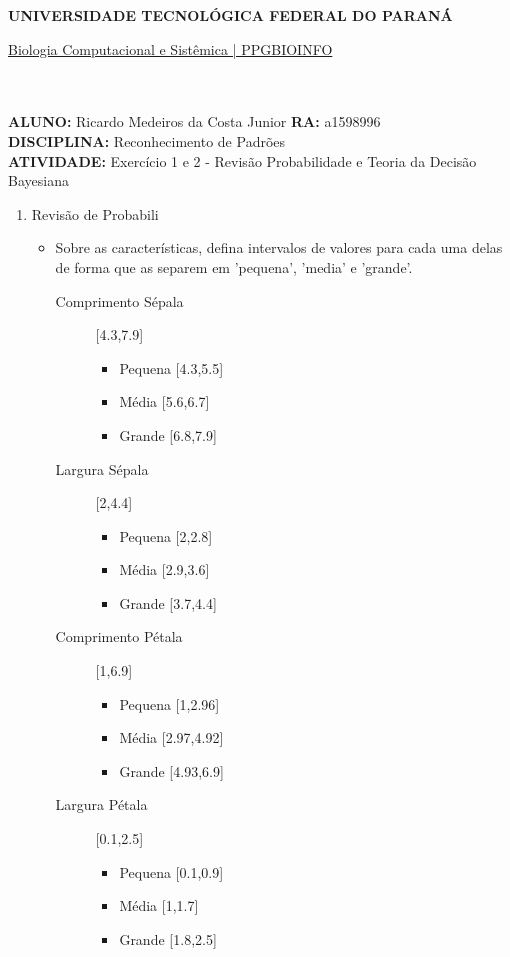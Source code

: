 \documentclass[a4paper, 12pt]{article}
\begin{document}
\textbf{UNIVERSIDADE TECNOLÓGICA FEDERAL DO PARANÁ}\\
\centerline{\underline{Biologia Computacional e Sistêmica | PPGBIOINFO}}\\\\
\textbf{ALUNO:} Ricardo Medeiros da Costa Junior   \textbf{RA:} a1598996 \\
\textbf{DISCIPLINA:} Reconhecimento de Padrões\\
\textbf{ATIVIDADE:} Exercício 1 e 2 - Revisão Probabilidade e Teoria da Decisão Bayesiana \\
\begin{enumerate}
  \item Revisão de Probabili
\begin{itemize} 
\item Sobre as características, defina intervalos de valores para cada uma delas de forma que as separem em 'pequena', 'media' e 'grande'.
  \begin{description}
  \item[Comprimento Sépala ] [4.3,7.9]
    \begin{itemize}
    \item Pequena {[}4.3,5.5{]}
    \item Média {[}5.6,6.7{]}
    \item Grande {[}6.8,7.9{]}      
    \end{itemize}
  \end{description}
  \begin{description}
  \item[Largura Sépala ] [2,4.4]
    \begin{itemize}
    \item Pequena {[}2,2.8{]}
    \item Média {[}2.9,3.6{]}
    \item Grande {[}3.7,4.4{]}      
    \end{itemize}
  \end{description}
  \begin{description}
  \item[Comprimento Pétala ] [1,6.9]
    \begin{itemize}
    \item Pequena {[}1,2.96{]}
    \item Média {[}2.97,4.92{]}
    \item Grande {[}4.93,6.9{]}      
    \end{itemize}
  \end{description}
  \begin{description}
  \item[Largura Pétala ] [0.1,2.5]
    \begin{itemize}
    \item Pequena {[}0.1,0.9{]}
    \item Média {[}1,1.7{]}
    \item Grande {[}1.8,2.5{]}      
    \end{itemize}
  \end{description}


\end{itemize}
\end{enumerate}
\end{document}
